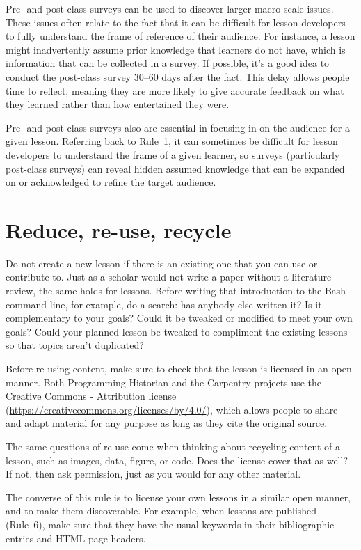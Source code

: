 \documentclass[10pt,letterpaper]{article}
\newcommand{\rulemajor}[1]{\section{#1}}
\begin{document}
Pre- and post-class surveys can be used to discover larger macro-scale issues.
These issues often relate to the fact that it can be difficult for lesson developers
to fully understand the frame of reference of their audience.
For instance, a lesson might inadvertently assume prior knowledge that learners do not have,
which is information that can be collected in a survey.
If possible, it's a good idea to conduct the post-class survey 30--60 days after the fact.
This delay allows people time to reflect,
meaning they are more likely to give accurate feedback on what they learned
rather than how entertained they were.

Pre- and post-class surveys also are essential in focusing in on the audience for a given lesson.
Referring back to Rule~1,
it can sometimes be difficult for lesson developers to understand the frame of a given learner,
so surveys (particularly post-class surveys) can reveal hidden assumed knowledge
that can be expanded on or acknowledged to refine the target audience.

\rulemajor{Reduce, re-use, recycle}

Do not create a new lesson if there is an existing one that you can use or contribute to.
Just as a scholar would not write a paper without a literature review,
the same holds for lessons.
Before writing that introduction to the Bash command line,
for example,
do a search:
has anybody else written it?
Is it complementary to your goals?
Could it be tweaked or modified to meet your own goals?
Could your planned lesson be tweaked to compliment the existing lessons so that topics aren't duplicated?

Before re-using content,
make sure to check that the lesson is licensed in an open manner.
Both Programming Historian and the Carpentry projects
use the Creative Commons - Attribution license
(\url{https://creativecommons.org/licenses/by/4.0/}),
which allows people to share and adapt material for any purpose
as long as they cite the original source.

The same questions of re-use come when thinking about recycling content of a lesson,
such as images, data, figure, or code.
Does the license cover that as well?
If not,
then ask permission,
just as you would for any other material.

The converse of this rule is to license your own lessons in a similar open manner,
and to make them discoverable.
For example,
when lessons are published (Rule~6),
make sure that they have the usual keywords in their bibliographic entries
and HTML page headers.
\end{document}
